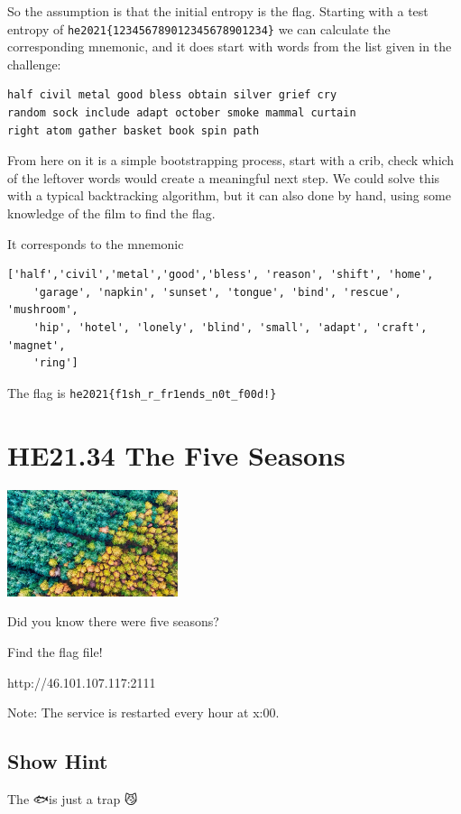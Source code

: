 \documentclass[english,a4paper,nols,noindent]{tufte-handout}
\begin{document}
So the assumption is that the initial entropy is the flag.  Starting with a test
entropy of \verb+he2021{123456789012345678901234}+ we can calculate the
corresponding mnemonic, and it does start with words from the list given in the
challenge:

\begin{verbatim} 
half civil metal good bless obtain silver grief cry
random sock include adapt october smoke mammal curtain 
right atom gather basket book spin path 
\end{verbatim}

From here on it is a simple bootstrapping process, start with a crib, check
which of the leftover words would create a meaningful next step.  We could solve
this with a typical backtracking algorithm, but it can also done by hand, using
some knowledge of the film to find the flag.

It corresponds to the mnemonic 
\begin{verbatim}
['half','civil','metal','good','bless', 'reason', 'shift', 'home',
    'garage', 'napkin', 'sunset', 'tongue', 'bind', 'rescue', 'mushroom',
    'hip', 'hotel', 'lonely', 'blind', 'small', 'adapt', 'craft', 'magnet',
    'ring']
\end{verbatim}

The flag is \verb+he2021{f1sh_r_fr1ends_n0t_f00d!}+

\hypertarget{he21.34}{%
\section{HE21.34 The Five Seasons}
  \label{he21.34}}
\begin{marginfigure}
    \includegraphics[width=50mm]{images/challenge34.jpg}
\end{marginfigure}

\noindent Did you know there were five seasons?

Find the flag file!

http://46.101.107.117:2111

Note: The service is restarted every hour at x:00.
\subsection{Show Hint}
The 🐟is just a trap 😼
\end{document}
